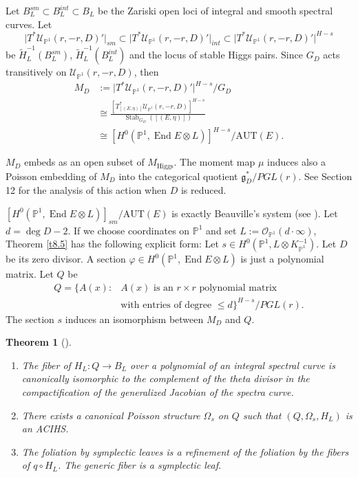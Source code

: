 \documentclass[12pt,a4paper,oneside,english]{smfart}
\newtheorem{thm}{Theorem}[section]
\theoremstyle{definition}
\theoremstyle{remark}
\DeclareMathOperator{\End}{End}
\DeclareMathOperator{\Stab}{Stab}
\newcommand{\Hig}{\mathrm{Higgs}}
\newcommand{\MH}{M_{\Hig}}
\newcommand{\cU}{\mathcal{U}}
\newcommand{\cO}{\mathcal{O}}
\newcommand{\tot}[1]{\lvert #1 \rvert}
\newcommand{\HL}{\widetilde{H}_{L}}
\begin{document}
Let $B_L^{sm} \subset B_L^{int} \subset B_L$ be the Zariski open loci of integral and smooth spectral curves. Let
\[
\tot{T^*\cU_{\mathbb{P}^1}(r, -r, D)'}_{sm} \subset \tot{T^*\cU_{\mathbb{P}^1}(r, -r, D)'}_{int} \subset \tot{T^*\cU_{\mathbb{P}^1}(r, -r, D)'}^{H-s}
\]
be $\HL^{-1}(B_L^{sm})$, $\HL^{-1}(B_L^{int})$ and the locus of stable Higgs pairs. Since $G_D$ acts transitively on $\cU_{\mathbb{P}^1}(r, -r, D)$, then
\begin{align*}
M_D &:= \tot{T^*\cU_{\mathbb{P}^1}(r, -r, D)'}^{H-s}/G_D \\
&\cong \frac{[T^*_{[(E, \eta)]}\cU_{\mathbb{P}^1}(r, -r, D)]^{H-s}}{\Stab_{G_D}([(E, \eta)])} \\
&\cong [H^0(\mathbb{P}^1, \End E \otimes L)]^{H-s}/\mathrm{AUT}(E).
\end{align*}

$M_D$ embeds as an open subset of $\MH$. The moment map $\mu$ induces also a Poisson embedding of $M_D$ into the categorical quotient $\mathfrak{g}_D^*/PGL(r)$. See \cite{Ar} Section 12 for the analysis of this action when $D$ is reduced.

$[H^0(\mathbb{P}^1, \End E \otimes L)]_{sm}/\mathrm{AUT}(E)$ is exactly Beauville's system (see \cite{B}). Let $d = \deg D - 2$. If we choose coordinates on $\mathbb{P}^1$ and set $L := \cO_{\mathbb{P}^1}(d \cdot \infty)$, Theorem \ref{t8.5} has the following explicit form: Let $s \in H^0(\mathbb{P}^1, L \otimes K_{\mathbb{P}^1}^{-1})$. Let $D$ be its zero divisor. A section $\varphi \in H^0(\mathbb{P}^1, \End E \otimes L)$ is just a polynomial matrix. Let $Q$ be
\begin{align*}
Q=\bigl\{A(x) \colon {}&A(x) \text{ is an } r \times r \text{ polynomial matrix} \\
&\text{with entries of degree } \leqslant d\bigr\}^{H-s}/PGL(r).
\end{align*}
The section $s$ induces an isomorphism between $M_D$ and $Q$.

\begin{thm}[\cite{B}]\label{t9.1}
\begin{enumerate}
    \item The fiber of $H_L \colon Q \to B_L$ over a polynomial of an integral spectral curve is canonically isomorphic to the complement of the theta divisor in the compactification of the generalized Jacobian of the spectra curve.
    \item There exists a canonical Poisson structure $\Omega_s$ on $Q$ such that $(Q, \Omega_s, H_L)$ is an ACIHS.
    \item The foliation by symplectic leaves is a refinement of the foliation by the fibers of $q \circ H_L$. The generic fiber is a symplectic leaf.
\end{enumerate}
\end{thm}
\end{document}
